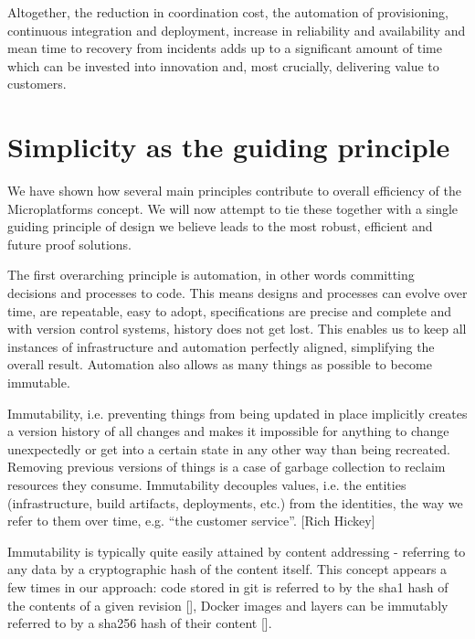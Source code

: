 \documentclass[reprint,amsmath,amssymb,aps]{revtex4-1}
\begin{document}
Altogether, the reduction in coordination cost, the automation of provisioning, continuous integration and deployment, increase in reliability and availability and mean time to recovery from incidents adds up to a significant amount of time which can be invested into innovation and, most crucially, delivering value to customers.


\section{\label{sec:simplicity}Simplicity as the guiding principle}

We have shown how several main principles contribute to overall efficiency of the Microplatforms concept. We will now attempt to tie these together with a single guiding principle of design we believe leads to the most robust, efficient and future proof solutions.

The first overarching principle is automation, in other words committing decisions and processes to code. This means designs and processes can evolve over time, are repeatable, easy to adopt, specifications are precise and complete and with version control systems, history does not get lost. This enables us to keep all instances of infrastructure and automation perfectly aligned, simplifying the overall result. Automation also allows as many things as possible to become immutable.

Immutability, i.e. preventing things from being updated in place implicitly creates a version history of all changes and makes it impossible for anything to change unexpectedly or get into a certain state in any other way than being recreated. Removing previous versions of things is a case of garbage collection to reclaim resources they consume. Immutability decouples values, i.e. the entities (infrastructure, build artifacts, deployments, etc.) from the identities, the way we refer to them over time, e.g. “the customer service”. [Rich Hickey]

Immutability is typically quite easily attained by content addressing - referring to any data by a cryptographic hash of the content itself. This concept appears a few times in our approach: code stored in git is referred to by the sha1 hash of the contents of a given revision [], Docker images and layers can be immutably referred to by a sha256 hash of their content []. 
\end{document}
